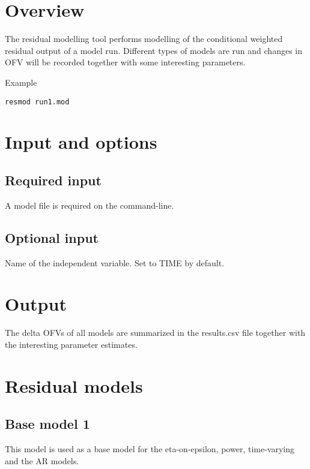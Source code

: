 



\maketitle
\newcommand{\guidetoolname}{resmod}


\section{Overview}
The residual modelling tool performs modelling of the conditional weighted residual output of a model run. Different types of models are run and changes in OFV will be recorded together with some interesting parameters.

Example
\begin{verbatim}
resmod run1.mod
\end{verbatim}

\section{Input and options}

\subsection{Required input}
A model file is required on the command-line.

\subsection{Optional input}

\begin{optionlist}
Name of the independent variable. Set to TIME by default.
\nextopt
\end{optionlist}

\section{Output}
The delta OFVs of all models are summarized in the results.csv file together with the interesting parameter estimates.

\section{Residual models}

\subsection{Base model 1}
This model is used as a base model for the eta-on-epsilon, power, time-varying and the AR models.


